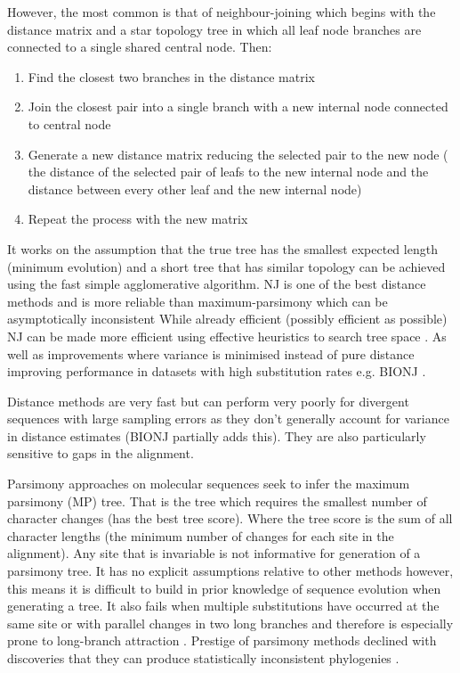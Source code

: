 However, the most common is that of neighbour-joining which begins with the distance matrix and a 
star topology tree in which all leaf node branches are connected to a single shared central node.
Then:
\begin{enumerate}
    \item Find the closest two branches in the distance matrix 
    \item Join the closest pair into a single branch with a new internal node connected to central node
    \item Generate a new distance matrix reducing the selected pair to the new node (     
        the distance of the selected pair of leafs to the new internal node 
    and the distance between every other leaf and the new internal node)
    \item Repeat the process with the new matrix \citep{Nei1987}
\end{enumerate}

It works on the assumption that the true tree has the smallest expected length (minimum evolution) and a short tree that has similar topology can be achieved using the 
fast simple agglomerative algorithm.  NJ is one of the best distance methods and 
is more reliable than maximum-parsimony which can be asymptotically inconsistent
While already efficient (possibly efficient as possible) NJ can be made more efficient 
using effective heuristics to search tree space \citep{Kumar1996}.
As well as improvements where variance is minimised instead of pure distance improving performance in datasets with high
substitution rates e.g. BIONJ \citep{Gascuel1997}.

Distance methods are very fast but can perform
very poorly for divergent sequences with large sampling errors as they don't generally account for variance in 
distance estimates \citep{Yang2012} (BIONJ partially adds this).  They are also
particularly sensitive to gaps in the alignment.



Parsimony approaches \citep{Camin1965} on molecular sequences \citep{Eck1966} seek to infer the maximum parsimony (MP) tree.
That is the tree which requires the smallest number of character changes (has the best tree score).  Where the tree score is the sum of 
all character lengths (the minimum number of changes for each site in the alignment).  Any site that is invariable is not
informative for generation of a parsimony tree.
It has no explicit assumptions relative to other methods however, this means it is difficult to build in 
prior knowledge of sequence evolution when generating a tree.
It also fails when multiple substitutions have occurred at the same site or with parallel changes in two long branches 
and therefore is especially prone to long-branch attraction
\citep{Felsenstein1978}.
Prestige of parsimony methods declined with discoveries that they can produce statistically inconsistent
phylogenies \citep{Felsenstein2001}.

